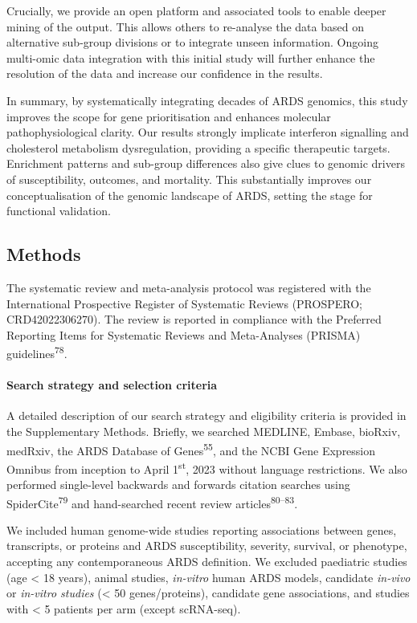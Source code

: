 \documentclass[
  11,
  a4paper,
]{article}
\let\oldparagraph\paragraph
\renewcommand{\paragraph}[1]{\oldparagraph{#1}\mbox{}}
\begin{document}
Crucially, we provide an open platform and associated tools to enable
deeper mining of the output. This allows others to re-analyse the data
based on alternative sub-group divisions or to integrate unseen
information. Ongoing multi-omic data integration with this initial study
will further enhance the resolution of the data and increase our
confidence in the results.

In summary, by systematically integrating decades of ARDS genomics, this
study improves the scope for gene prioritisation and enhances molecular
pathophysiological clarity. Our results strongly implicate interferon
signalling and cholesterol metabolism dysregulation, providing a
specific therapeutic targets. Enrichment patterns and sub-group
differences also give clues to genomic drivers of susceptibility,
outcomes, and mortality. This substantially improves our
conceptualisation of the genomic landscape of ARDS, setting the stage
for functional validation.

\newpage

\subsection{Methods}\label{methods}

The systematic review and meta-analysis protocol was registered with the
International Prospective Register of Systematic Reviews (PROSPERO;
CRD42022306270). The review is reported in compliance with the Preferred
Reporting Items for Systematic Reviews and Meta-Analyses (PRISMA)
guidelines\textsuperscript{78}.

\paragraph{Search strategy and selection
criteria}\label{search-strategy-and-selection-criteria}

A detailed description of our search strategy and eligibility criteria
is provided in the Supplementary Methods. Briefly, we searched MEDLINE,
Embase, bioRxiv, medRxiv, the ARDS Database of
Genes\textsuperscript{55}, and the NCBI Gene Expression Omnibus from
inception to April 1\textsuperscript{st}, 2023 without language
restrictions. We also performed single-level backwards and forwards
citation searches using SpiderCite\textsuperscript{79} and hand-searched
recent review articles\textsuperscript{80--83}.

We included human genome-wide studies reporting associations between
genes, transcripts, or proteins and ARDS susceptibility, severity,
survival, or phenotype, accepting any contemporaneous ARDS definition.
We excluded paediatric studies (age \textless{} 18 years), animal
studies, \emph{in-vitro} human ARDS models, candidate \emph{in-vivo} or
\emph{in-vitro studies} (\textless{} 50 genes/proteins), candidate gene
associations, and studies with \textless{} 5 patients per arm (except
scRNA-seq).
\end{document}
